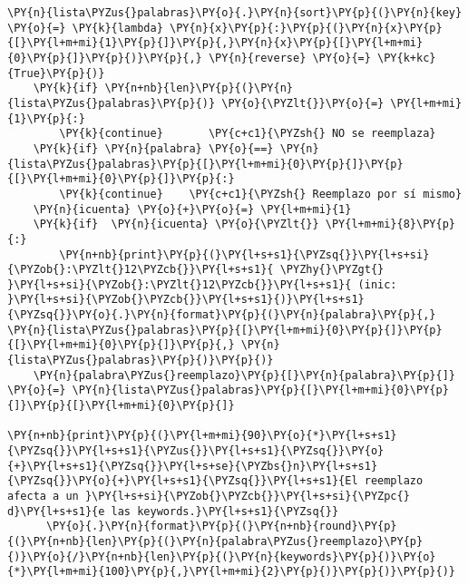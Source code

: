 \begin{tcolorbox}[breakable, size=fbox, boxrule=1pt, pad at break*=1mm,colback=cellbackground, colframe=cellborder]
\begin{Verbatim}[commandchars=\\\{\}]
    \PY{n}{lista\PYZus{}palabras}\PY{o}{.}\PY{n}{sort}\PY{p}{(}\PY{n}{key} \PY{o}{=} \PY{k}{lambda} \PY{n}{x}\PY{p}{:}\PY{p}{(}\PY{n}{x}\PY{p}{[}\PY{l+m+mi}{1}\PY{p}{]}\PY{p}{,}\PY{n}{x}\PY{p}{[}\PY{l+m+mi}{0}\PY{p}{]}\PY{p}{)}\PY{p}{,} \PY{n}{reverse} \PY{o}{=} \PY{k+kc}{True}\PY{p}{)}    
    \PY{k}{if} \PY{n+nb}{len}\PY{p}{(}\PY{n}{lista\PYZus{}palabras}\PY{p}{)} \PY{o}{\PYZlt{}}\PY{o}{=} \PY{l+m+mi}{1}\PY{p}{:}
        \PY{k}{continue}       \PY{c+c1}{\PYZsh{} NO se reemplaza}
    \PY{k}{if} \PY{n}{palabra} \PY{o}{==} \PY{n}{lista\PYZus{}palabras}\PY{p}{[}\PY{l+m+mi}{0}\PY{p}{]}\PY{p}{[}\PY{l+m+mi}{0}\PY{p}{]}\PY{p}{:}
        \PY{k}{continue}    \PY{c+c1}{\PYZsh{} Reemplazo por sí mismo}
    \PY{n}{icuenta} \PY{o}{+}\PY{o}{=} \PY{l+m+mi}{1}
    \PY{k}{if}  \PY{n}{icuenta} \PY{o}{\PYZlt{}} \PY{l+m+mi}{8}\PY{p}{:}
        \PY{n+nb}{print}\PY{p}{(}\PY{l+s+s1}{\PYZsq{}}\PY{l+s+si}{\PYZob{}:\PYZlt{}12\PYZcb{}}\PY{l+s+s1}{ \PYZhy{}\PYZgt{} }\PY{l+s+si}{\PYZob{}:\PYZlt{}12\PYZcb{}}\PY{l+s+s1}{ (inic: }\PY{l+s+si}{\PYZob{}\PYZcb{}}\PY{l+s+s1}{)}\PY{l+s+s1}{\PYZsq{}}\PY{o}{.}\PY{n}{format}\PY{p}{(}\PY{n}{palabra}\PY{p}{,} \PY{n}{lista\PYZus{}palabras}\PY{p}{[}\PY{l+m+mi}{0}\PY{p}{]}\PY{p}{[}\PY{l+m+mi}{0}\PY{p}{]}\PY{p}{,} \PY{n}{lista\PYZus{}palabras}\PY{p}{)}\PY{p}{)}
    \PY{n}{palabra\PYZus{}reemplazo}\PY{p}{[}\PY{n}{palabra}\PY{p}{]} \PY{o}{=} \PY{n}{lista\PYZus{}palabras}\PY{p}{[}\PY{l+m+mi}{0}\PY{p}{]}\PY{p}{[}\PY{l+m+mi}{0}\PY{p}{]}

\PY{n+nb}{print}\PY{p}{(}\PY{l+m+mi}{90}\PY{o}{*}\PY{l+s+s1}{\PYZsq{}}\PY{l+s+s1}{\PYZus{}}\PY{l+s+s1}{\PYZsq{}}\PY{o}{+}\PY{l+s+s1}{\PYZsq{}}\PY{l+s+se}{\PYZbs{}n}\PY{l+s+s1}{\PYZsq{}}\PY{o}{+}\PY{l+s+s1}{\PYZsq{}}\PY{l+s+s1}{El reemplazo afecta a un }\PY{l+s+si}{\PYZob{}\PYZcb{}}\PY{l+s+si}{\PYZpc{} d}\PY{l+s+s1}{e las keywords.}\PY{l+s+s1}{\PYZsq{}}
      \PY{o}{.}\PY{n}{format}\PY{p}{(}\PY{n+nb}{round}\PY{p}{(}\PY{n+nb}{len}\PY{p}{(}\PY{n}{palabra\PYZus{}reemplazo}\PY{p}{)}\PY{o}{/}\PY{n+nb}{len}\PY{p}{(}\PY{n}{keywords}\PY{p}{)}\PY{o}{*}\PY{l+m+mi}{100}\PY{p}{,}\PY{l+m+mi}{2}\PY{p}{)}\PY{p}{)}\PY{p}{)}
\end{Verbatim}
\end{tcolorbox}

